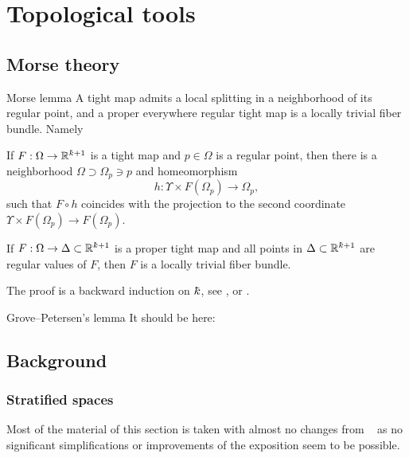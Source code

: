 \chapter{Topological tools}

\section{Morse theory}

\begin{thm}{Morse lemma}\label{lem:morse} A tight map admits a local splitting in a neighborhood of its regular point, and a proper everywhere regular tight map is a locally trivial fiber bundle. Namely

\begin{subthm}{} If $F:\Omega\to\RR^{\kay+1}$ is a tight map and $p\in \Omega$ is a regular point, then there is a neighborhood $\Omega\supset\Omega_p\ni p$ and homeomorphism 
\[h:\Upsilon\times F(\Omega_p)\to \Omega_p,\] 
such that
$F\circ h$ coincides with the projection to the second coordinate $\Upsilon\times F(\Omega_p)\to F(\Omega_p)$.
\end{subthm}

\begin{subthm}{} If $F:\Omega\to\Delta\subset\RR^{\kay+1}$ is a proper tight map and all points in $\Delta\subset \RR^{\kay+1}$ are regular values of $F$, then $F$ is a locally trivial fiber bundle.
\end{subthm}
\end{thm}
The proof is a backward induction on $\kay$, see 
\cite[1.4]{perelman:morse}, \cite[1.4.1]{perelman:spaces2} or
\cite[6.7]{kapovitch:stability}.


\begin{thm}{Grove--Petersen's lemma}\label{lem:grove-petersen}
It should be here: \cite[lemma 1]{grove-petersen:rad-sphere}
\end{thm}



\section{Background}\label{sec:background}
\subsection{Stratified spaces} 
Most of the material of this section is taken with almost no changes  from ~\cite{Per} as no significant simplifications or improvements of the exposition seem to be possible.

